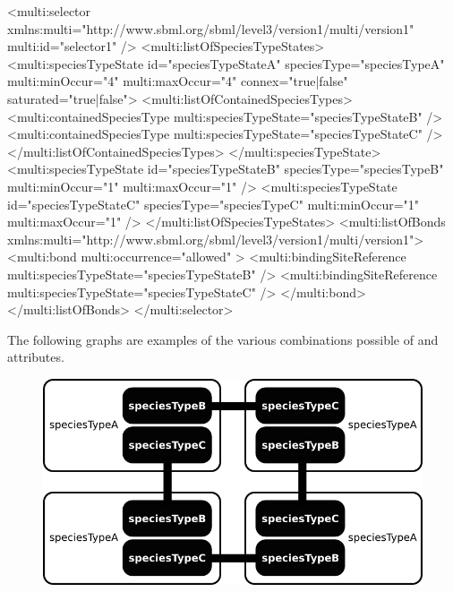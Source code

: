 \begin{example}
<multi:selector xmlns:multi="http://www.sbml.org/sbml/level3/version1/multi/version1" 
                multi:id="selector1" />
  <multi:listOfSpeciesTypeStates>
    <multi:speciesTypeState id="speciesTypeStateA" speciesType="speciesTypeA"                                           
                            multi:minOccur="4" multi:maxOccur="4"
                            connex="{true|false}" saturated="{true|false}">
      <multi:listOfContainedSpeciesTypes>
        <multi:containedSpeciesType multi:speciesTypeState="speciesTypeStateB" />
        <multi:containedSpeciesType multi:speciesTypeState="speciesTypeStateC" />
      </multi:listOfContainedSpeciesTypes>
    </multi:speciesTypeState>
    <multi:speciesTypeState id="speciesTypeStateB" speciesType="speciesTypeB"                                           
                            multi:minOccur="1" multi:maxOccur="1" />
    <multi:speciesTypeState id="speciesTypeStateC" speciesType="speciesTypeC"                                           
                            multi:minOccur="1" multi:maxOccur="1" />
  </multi:listOfSpeciesTypeStates>
  <multi:listOfBonds xmlns:multi="http://www.sbml.org/sbml/level3/version1/multi/version1">
    <multi:bond multi:occurrence="allowed" >
      <multi:bindingSiteReference multi:speciesTypeState="speciesTypeStateB" />
      <multi:bindingSiteReference multi:speciesTypeState="speciesTypeStateC" />
    </multi:bond>
  </multi:listOfBonds>
</multi:selector> 
\end{example}

The following graphs are examples of the various combinations possible of  and  attributes. 

\begin{figure}[H]
\begin{center}
\includegraphics[scale=0.7]{figs/pngs/ex_connex-saturated.png} 
\caption{}
\label{fig:ex_connex-saturated}
\end{center}
\end{figure}

